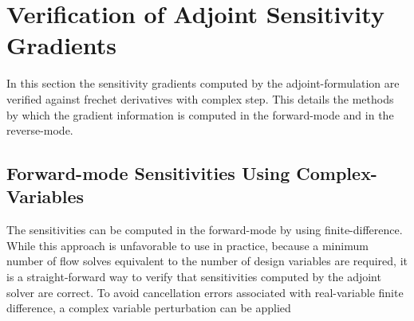 \chapter{Verification of Adjoint Sensitivity Gradients}
\label{chapter-six}

In this section the sensitivity gradients computed by the adjoint-formulation
are verified against frechet derivatives with complex step.  This details the
methods by which the gradient information is computed in the forward-mode and in
the reverse-mode.

\section{Forward-mode Sensitivities Using Complex-Variables}

The sensitivities can be computed in the forward-mode by using
finite-difference.  While this approach is unfavorable to use in practice,
because a minimum number of flow solves equivalent to the number of design
variables are required, it is a straight-forward way to verify that
sensitivities computed by the adjoint solver are correct.  To avoid cancellation
errors associated with real-variable finite difference, a complex variable
perturbation can be applied
